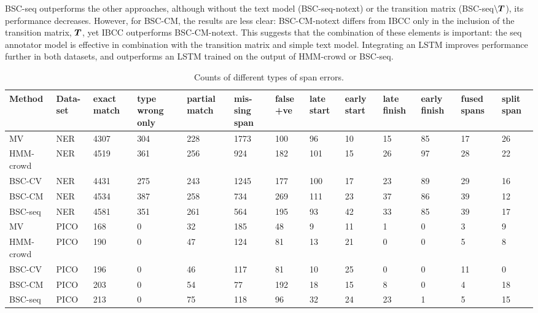 BSC-seq outperforms the other approaches, although 
without the text model (BSC-seq-notext) or the transition matrix (BSC-seq$\backslash\boldsymbol T$),
its performance decreases.
However, for BSC-CM, the results are less clear: BSC-CM-notext differs from IBCC only in the 
inclusion of the transition matrix, $\boldsymbol T$, yet IBCC outperforms BSC-CM-notext.
This suggests that the combination of these elements is important: the seq annotator model is effective 
in combination with the transition matrix and simple text model.
Integrating an LSTM improves performance further in both datasets, and outperforms an LSTM trained on the output of HMM-crowd or BSC-seq.

\begin{table}[h]
\small
\begin{tabularx}{\textwidth}{l X X X X X X X X X X X X}
\toprule
Method & Data-set & exact match & type wrong only & partial match & mis-sing span & false +ve & late start & early start & late finish & early finish & fused spans & split span \\ \midrule
MV & NER & 4307 & 304 & 228 & 1773 & 100 & 96 & 10 & 15 & 85 & 17 & 26 \\
HMM-crowd & NER & 4519 & 361 & 256 & 924 & 182 & 101 & 15 & 26 & 97 & 28 & 22 \\
BSC-CV & NER & 4431 & 275 & 243 & 1245 & 177 & 100 & 17 & 23 & 89 & 29 & 16 \\
BSC-CM & NER & 4534 & 387 & 258 & 734 & 269 & 111 & 23 & 37 & 86 & 39 & 12 \\
BSC-seq & NER & 4581 & 351 & 261 & 564 & 195 & 93 & 42 & 33 & 85 & 39 & 17 
\\
\midrule 
MV & PICO    & 168 & 0 & 32 & 185 & 48 & 9 & 11 & 1 & 0 & 3 & 9 \\
HMM-crowd    & PICO & 190 & 0 & 47 & 124 & 81 & 13 & 21 & 0 & 0 & 5 & 8 \\
BSC-CV       & PICO & 196 & 0 & 46 & 117 & 81 & 10 & 25 & 0 & 0 & 11 & 0 \\
BSC-CM       & PICO & 203 & 0 & 54 & 77 & 192 & 18 & 15 & 8 & 0 & 4 & 18 \\
BSC-seq & PICO & 213 & 0 & 75 & 118 & 96 & 32 & 24 & 23  & 1 & 5 & 15 \\
\bottomrule
\end{tabularx}
\caption{Counts of different types of span errors.}
\label{tab:error_analysis}
\end{table}

